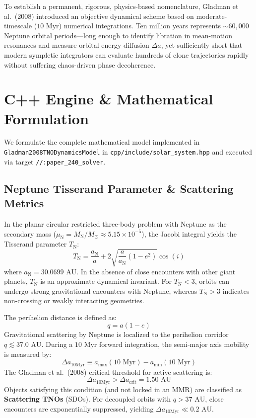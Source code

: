 \documentclass[11pt,a4paper]{article}
\begin{document}
To establish a permanent, rigorous, physics-based nomenclature, Gladman et al.\ (2008) introduced an objective dynamical scheme based on moderate-timescale ($10\text{ Myr}$) numerical integrations. Ten million years represents $\sim 60{,}000$ Neptune orbital periods---long enough to identify libration in mean-motion resonances and measure orbital energy diffusion $\Delta a$, yet sufficiently short that modern sympletic integrators can evaluate hundreds of clone trajectories rapidly without suffering chaos-driven phase decoherence.

\section{C++ Engine \& Mathematical Formulation}
We formulate the complete mathematical model implemented in \texttt{Gladman2008TNODynamicsModel} in \texttt{cpp/include/solar\_system.hpp} and executed via target \texttt{//:paper\_240\_solver}.

\subsection{Neptune Tisserand Parameter \& Scattering Metrics}
In the planar circular restricted three-body problem with Neptune as the secondary mass ($\mu_{\text{N}} = M_{\text{N}} / M_\odot \approx 5.15 \times 10^{-5}$), the Jacobi integral yields the Tisserand parameter $T_{\text{N}}$:
\begin{equation}
T_{\text{N}} = \frac{a_{\text{N}}}{a} + 2 \sqrt{\frac{a}{a_{\text{N}}} (1 - e^2)} \cos(i)
\end{equation}
where $a_{\text{N}} = 30.0699\text{ AU}$. In the absence of close encounters with other giant planets, $T_{\text{N}}$ is an approximate dynamical invariant. For $T_{\text{N}} < 3$, orbits can undergo strong gravitational encounters with Neptune, whereas $T_{\text{N}} > 3$ indicates non-crossing or weakly interacting geometries.

The perihelion distance is defined as:
\begin{equation}
q = a (1 - e)
\end{equation}
Gravitational scattering by Neptune is localized to the perihelion corridor $q \lesssim 37.0\text{ AU}$. During a $10\text{ Myr}$ forward integration, the semi-major axis mobility is measured by:
\begin{equation}
\Delta a_{10\text{Myr}} \equiv a_{\max}(10\text{ Myr}) - a_{\min}(10\text{ Myr})
\end{equation}
The Gladman et al.\ (2008) critical threshold for active scattering is:
\begin{equation}
\Delta a_{10\text{Myr}} > \Delta a_{\text{crit}} = 1.50\text{ AU}
\end{equation}
Objects satisfying this condition (and not locked in an MMR) are classified as \textbf{Scattering TNOs} (SDOs). For decoupled orbits with $q > 37\text{ AU}$, close encounters are exponentially suppressed, yielding $\Delta a_{10\text{Myr}} \ll 0.2\text{ AU}$.
\end{document}
